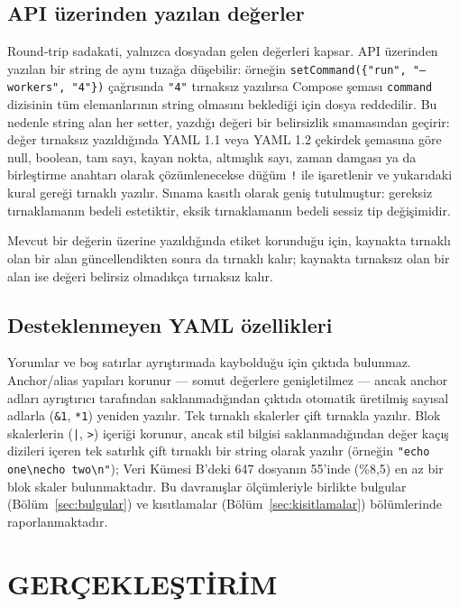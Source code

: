 \documentclass[12pt,a4paper]{article}
\begin{document}
\subsection{API üzerinden yazılan değerler}
Round-trip sadakati, yalnızca dosyadan gelen değerleri kapsar. API
üzerinden yazılan bir string de aynı tuzağa düşebilir: örneğin
\texttt{setCommand(\{"run", "--workers", "4"\})} çağrısında
\texttt{"4"} tırnaksız yazılırsa Compose şeması \texttt{command} dizisinin
tüm elemanlarının string olmasını beklediği için dosya reddedilir. Bu
nedenle string alan her setter, yazdığı değeri bir belirsizlik sınamasından
geçirir: değer tırnaksız yazıldığında YAML 1.1 veya YAML 1.2 çekirdek
şemasına göre null, boolean, tam sayı, kayan nokta, altmışlık sayı, zaman
damgası ya da birleştirme anahtarı olarak çözümlenecekse düğüm \texttt{!}
ile işaretlenir ve yukarıdaki kural gereği tırnaklı yazılır. Sınama
kasıtlı olarak geniş tutulmuştur: gereksiz tırnaklamanın bedeli
estetiktir, eksik tırnaklamanın bedeli sessiz tip değişimidir.

Mevcut bir değerin üzerine yazıldığında etiket korunduğu için, kaynakta
tırnaklı olan bir alan güncellendikten sonra da tırnaklı kalır; kaynakta
tırnaksız olan bir alan ise değeri belirsiz olmadıkça tırnaksız kalır.

\subsection{Desteklenmeyen YAML özellikleri}
Yorumlar ve boş satırlar ayrıştırmada kaybolduğu için çıktıda bulunmaz.
Anchor/alias yapıları korunur --- somut değerlere genişletilmez --- ancak
anchor adları ayrıştırıcı tarafından saklanmadığından çıktıda otomatik
üretilmiş sayısal adlarla (\texttt{\&1}, \texttt{*1}) yeniden yazılır.
Tek tırnaklı skalerler çift tırnakla yazılır. Blok skalerlerin
(\texttt{|}, \texttt{>}) içeriği korunur, ancak stil bilgisi
saklanmadığından değer kaçış dizileri içeren tek satırlık çift tırnaklı bir
string olarak yazılır (örneğin \texttt{"echo one\textbackslash necho two\textbackslash n"});
Veri Kümesi B'deki 647 dosyanın 55'inde (\%8,5) en az bir blok skaler
bulunmaktadır. Bu davranışlar ölçümleriyle birlikte bulgular
(Bölüm~\ref{sec:bulgular}) ve kısıtlamalar (Bölüm~\ref{sec:kisitlamalar})
bölümlerinde raporlanmaktadır.

\section{GERÇEKLEŞTİRİM}
\label{sec:gerceklestirim}
\end{document}

